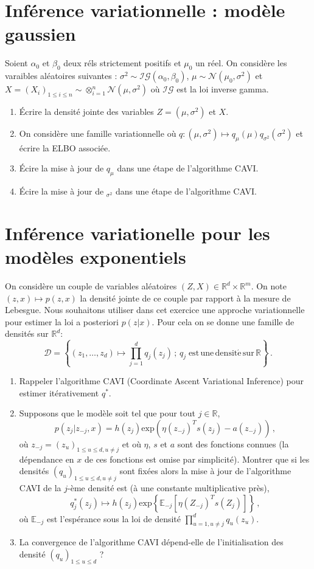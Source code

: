 \documentclass[a4paper,10pt,fleqn]{article}
\newcommand{\eqsp}{\,}
\newcommand{\1}{\ensuremath{\mathbbm{1}}}
\begin{document}
\section{Inf\'erence variationnelle : mod\`ele gaussien}
Soient $\alpha_0$ et $\beta_0$ deux r\'els strictement positifs et $\mu_0$ un r\'eel. On consid\`ere les varaibles al\'eatoires suivantes : $\sigma^2 \sim\mathcal{IG}(\alpha_0,\beta_0)$, $\mu\sim\mathcal{N}(\mu_0,\sigma^2)$ et $X = (X_i)_{1\leq i\leq n}\sim\otimes_{i=1}^n\mathcal{N}(\mu,\sigma^2)$ o\`u $\mathcal{IG}$ est la loi inverse gamma.
\begin{enumerate}
\item \'Ecrire la densit\'e jointe des variables $Z=(\mu,\sigma^2)$ et $X$.
\item On consid\`ere une famille variationnelle o\`u $q:(\mu,\sigma^2)\mapsto q_\mu(\mu)q_{\sigma^2}(\sigma^2)$ et \'ecrire la ELBO associ\'ee.
\item \'Ecire la mise \`a jour de $q_\mu$ dans une \'etape de l'algorithme CAVI. 
\item \'Ecire la mise \`a jour de $_{\sigma^2}$ dans une \'etape de l'algorithme CAVI. 
\end{enumerate}

\section{Inf\'erence variationelle pour les mod\`eles exponentiels}
On consid\`ere un couple de variables al\'eatoires $(Z,X)\in\mathbb{R}^d\times \mathbb{R}^m$. On note $(z,x) \mapsto p(z,x)$ la densit\'e jointe de ce couple par rapport \`a la mesure de Lebesgue. Nous souhaitons utiliser dans cet exercice une approche variationnelle pour estimer la loi a posteriori $p(z|x)$. Pour cela on se donne une famille de densit\'es sur $\mathbb{R}^d$:
$$
\mathcal{D} = \left\{(z_1,\ldots,z_d)\mapsto \prod_{j=1}^dq_j(z_j)\eqsp;\eqsp q_j\; \mathrm{est\,une\,densit\acute e\,sur\,\mathbb{R}}\right\}\eqsp.
$$
\begin{enumerate}
\item Rappeler l'algorithme CAVI (Coordinate Ascent Variational Inference) pour estimer it\'erativement $q^*$.
\item Supposons que le mod\`ele soit tel que pour tout $j\in\mathbb{R}$, 
$$
p(z_j|z_{-j},x) = h(z_j)\mathrm{exp}(\eta(z_{-j})^Ts(z_j) - a(z_{-j}))\eqsp,
$$ 
o\`u $z_{-j} = (z_u)_{1\leqslant u\leqslant d, u \neq j}$ et o\`u $\eta$, $s$ et $a$ sont des fonctions connues (la d\'ependance en $x$ de ces fonctions est omise par simplicit\'e). Montrer que si les densit\'es $(q_u)_{1\leqslant u\leqslant d, u \neq j}$ sont fix\'ees alors la mise \`a jour de l'algorithme CAVI de la $j$-\`eme densit\'e est  (\`a une constante multiplicative pr\`es),
$$
q^*_j(z_j) \mapsto h(z_j) \mathrm{exp}\left\{\mathbb{E}_{-j}[\eta(Z_{-j})^Ts(Z_j)]\right\}\eqsp,
$$
o\`u $\mathbb{E}_{-j}$ est l'esp\'erance sous la loi de densit\'e $\prod_{u=1, u\neq j}^d q_u(z_u)$.
\item La convergence de l'algorithme CAVI  d\'epend-elle de l'initialisation des densit\'e $(q_u)_{1\leqslant u\leqslant d}$ ?
\end{enumerate}
\end{document}
